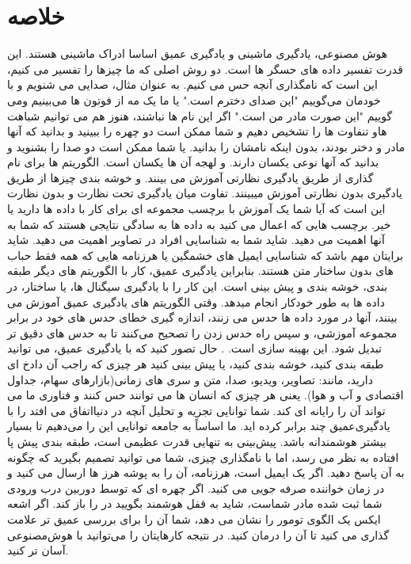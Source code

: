 \section{خلاصه}
هوش مصنوعی، یادگیری ماشینی و یادگیری عمیق
اساسا ادراک ماشینی هستند. این قدرت تفسیر داده های حسگر ها است. 
 دو روش اصلی که ما چیزها را تفسیر می کنیم، این است که
نامگذاری آنچه حس می کنیم.  به عنوان مثال، صدایی می شنویم و با خودمان می‌گوییم "این صدای دخترم است." 
یا ما یک مه از
فوتون ها  می‌بینیم ومی گوییم "این صورت مادر من است." 
اگر این نام ها نباشند، 
 هنوز هم می توانیم شباهت هاو تنفاوت ها را تشخیص دهیم و
شما ممکن است دو چهره را ببینید و بدانید که آنها
مادر و دختر بودند، بدون اینکه نامشان را بدانید. 
یا
شما ممکن است دو صدا را بشنوید و بدانید که آنها نوعی یکسان دارند. و لهجه آن ها یکسان است.  الگوریتم ها برای نام گذاری از طریق یادگیری نظارتی آموزش می بینند.  و خوشه بندی چیزها
از طریق یادگیری بدون نظارتی آموزش میبینند.  تفاوت میان
یادگیری تحت نظارت و بدون نظارت این است که آیا شما یک
آموزش با برچسب مجموعه ای برای کار با داده ها دارید یا خیر.  برچسب هایی که اعمال می کنید
به داده ها به سادگی نتایجی هستند که شما به آنها اهمیت می دهید. 
شاید شما
به شناسایی افراد در تصاویر اهمیت می دهید.  شاید برایتان مهم باشد که 
شناسایی ایمیل های خشمگین یا هرزنامه هایی که همه فقط حباب های بدون ساختار متن هستند. 
بنابراین یادگیری عمیق،  کار با الگوریتم های دیگر 
 طبقه بندی، خوشه بندی و پیش بینی است.  این کار را با یادگیری 
سیگنال ها، یا ساختار، در داده ها به طور خودکار انجام میدهد.  وقتی الگوریتم های یادگیری عمیق
 آموزش می بینند، آنها در مورد داده ها حدس می زنند،
اندازه گیری خطای حدس های خود در برابر مجموعه آموزشی، و
سپس راه حدس زدن را تصحیح می‌کنند تا به حدس های دقیق تر تبدیل شود. این بهینه سازی است. 
.
حال تصور کنید که با یادگیری عمیق، می توانید طبقه بندی کنید، 
خوشه بندی کنید،  یا پیش بینی کنید هر چیزی که راجب آن دادخ ای دارید،  مانند: تصاویر، ویدیو،
صدا، متن و  سری های زمانی(بازارهای سهام،
جداول اقتصادی و آب و هوا).  یعنی هر چیزی که
انسان ها می توانند حس کنند و فناوری ما می تواند آن را رایانه ای کند.  شما
توانایی تجزیه و تحلیل آنچه در دنیا‌اتفاق می افتد را با یادگیری‌عمیق چند برابر کرده اید.  ما اساساً به جامعه توانایی این را می‌دهیم تا بسیار بیشتر هوشمندانه باشد. 
پیش‌بینی به تنهایی قدرت عظیمی است، 
 طبقه بندی پیش پا افتاده به نظر می رسد، اما با نامگذاری
چیزی، شما می توانید تصمیم بگیرید که چگونه به آن پاسخ دهید. اگر یک ایمیل است، 
هرزنامه، آن را به پوشه هرز ها ارسال می کنید و در زمان خواننده صرفه جویی می کنید.
اگر چهره ای که توسط دوربین درب ورودی شما ثبت شده مادر شماست،
شاید به قفل هوشمند بگویید در را باز کند. اگر اشعه ایکس
یک الگوی تومور را نشان می دهد،  شما آن را برای بررسی عمیق تر علامت گذاری می کنید تا آن را درمان کنید.
در نتیجه کارهایتان را می‌توانید با هوش‌مصنوعی آسان تر کنید.
\cite{ongsulee2017artificial}
\\\
